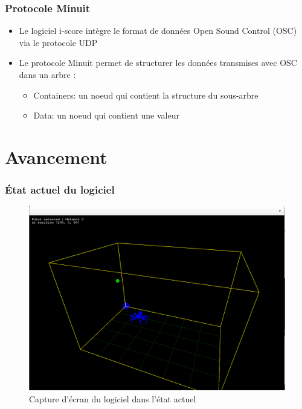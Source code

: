 \documentclass[10pt]{beamer}
\begin{document}
\begin{frame}
	\frametitle{Protocole Minuit}
    \begin{itemize}
		\item Le logiciel i-score intègre le format de données Open Sound Control (OSC) via le protocole UDP
        \item Le protocole Minuit permet de structurer les données transmises avec OSC dans un arbre : 
        \begin{itemize}
   		\item Containers: un noeud qui contient la structure du sous-arbre
        \item Data: un noeud qui contient une valeur
	\end{itemize}
    	\end{itemize}

\end{frame}



\section{Avancement}
\begin{frame}
	\frametitle{État actuel du logiciel}
	\begin{figure}
     \includegraphics[scale=0.35]{screenshotRainofMusic.png}
	\caption{Capture d'écran du logiciel dans l'état actuel}
    \end{figure}
\end{frame}
\end{document}
